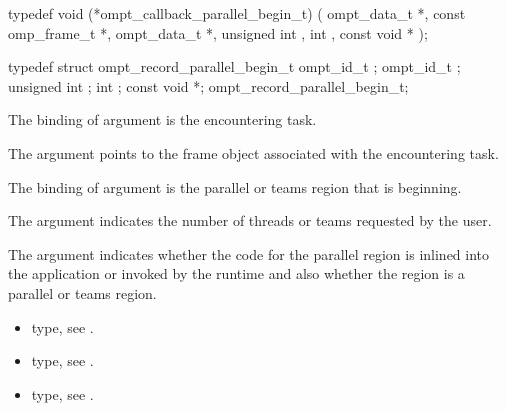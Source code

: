 \label{sec:ompt_callback_parallel_begin_t}
\format

\begin{ccppspecific}
\begin{omptCallback}
typedef void (*ompt_callback_parallel_begin_t) (
  ompt_data_t *,
  const omp_frame_t *,
  ompt_data_t *,
  unsigned int ,
  int ,
  const void *
);
\end{omptCallback}
\end{ccppspecific}


\record

\begin{ccppspecific}
\begin{omptRecord}
typedef struct ompt_record_parallel_begin_t {
  ompt_id_t ;
  ompt_id_t ;
  unsigned int ;
  int ;
  const void *;
} ompt_record_parallel_begin_t;
\end{omptRecord}
\end{ccppspecific}


\argdesc

The binding of argument  is the
encountering task.

The argument  points to the frame object
associated with the encountering task.

The binding of argument  is the parallel or teams
region that is beginning.

The argument 
indicates the number of threads or teams requested by the user.

The argument  indicates whether the code for the
parallel region is inlined into the application or invoked by the
runtime and also whether the region is a parallel or teams region.

\codeptrdesc

\crossreferences
\begin{itemize}
\item {} type, see .
\item {} type, see .
\item {} type, see .
\end{itemize}



